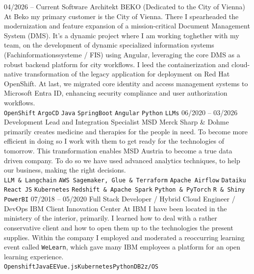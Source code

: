 \documentclass[9pt]{developercv} %
\begin{document}
\begin{entrylist}
	\entry
		{04/2026 -- Current}
		{Software Architekt}
		{BEKO (Dedicated to the City of Vienna)}
		{At Beko my primary customer is the City of Vienna. There I spearheaded the modernization and feature expansion of a mission-critical Document Management System (DMS). It's a dynamic project where I am working toghether with my team, on the development of dynamic specialized information systems (Fachinformationssysteme / FIS) using Angular, leveraging the core DMS as a robust backend platform for city workflows. I leed the containerization and cloud-native transformation of the legacy application for deployment on Red Hat OpenShift. At last, we migrated core identity and access management systems to Microsoft Entra ID, enhancing security compliance and user authorization workflows. \\ 
			\texttt{OpenShift} \slashsep \texttt{ArgoCD} \slashsep \texttt{Java}  \slashsep \texttt{SpringBoot} \slashsep \texttt{Angular} \slashsep \texttt{Python} \slashsep \texttt{LLMs}
		}
	\entry
		{06/2020 -- 03/2026}
		{Development Lead and Integration Specialist}
		{MSD}
		{Merck Sharp \& Dohme primarily creates medicine and therapies for the people in need. To become more efficient in doing so I work with them to get ready for the technologies of tomorrow. This transformation enables MSD Austria to become a true data driven company. To do so we have used advanced analytics techniques, to help our business, making the right decisions. \\ 
			\texttt{LLM \& Langchain} \slashsep \texttt{AWS Sagemaker, Glue \& Terraform} \slashsep \texttt{Apache Airflow} \slashsep \texttt{Dataiku}  \slashsep \texttt{React JS} \slashsep \texttt{Kubernetes} \slashsep \texttt{Redshift \& Apache Spark} \slashsep \texttt{Python \& PyTorch} \slashsep \texttt{R \& Shiny}  \slashsep \texttt{PowerBI}
		}
	\entry
		{07/2018 -- 05/2020}
		{Full Stack Developer / Hybrid Cloud Engineer / DevOps}
		{IBM Client Innovation Center}
		{At IBM I have been located in the ministery of the interior, primarily. I learned how to deal with a rather conservative client and how to open them up to the technologies the present supplies. Within the company I employed and moderated a reoccurring learning event called \texttt{WeLearn}, which gave many IBM employees a platform for an open learning experience. \\
			\texttt{Openshift}\slashsep\texttt{JavaEE}\slashsep\texttt{Vue.js}\slashsep\texttt{Kubernetes}\slashsep\texttt{Python}\slashsep\texttt{DB2}\slashsep\texttt{z/OS}
}
\end{entrylist}
\end{document}
